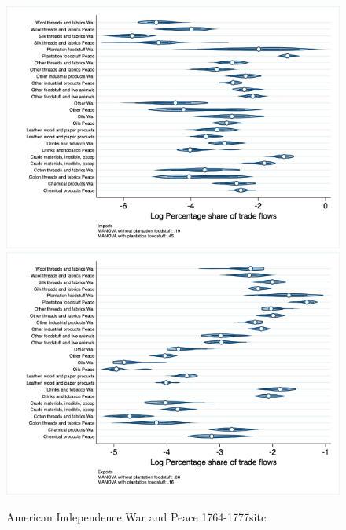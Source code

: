 \documentclass[12pt,a4paper,notitlepage,english]{article}
\begin{document}
\begin{figure}
\centering
\caption{American Independence War and Peace 1764-1777sitc}
\label{peace1764_1777_indep_nat_distr_sitc}
\includegraphics[scale=.4]{peace1764_1777_indep_nat_distr_Isitc}
\includegraphics[scale=.4]{peace1764_1777_indep_nat_distr_Xsitc}
\end{figure}
\end{document}
